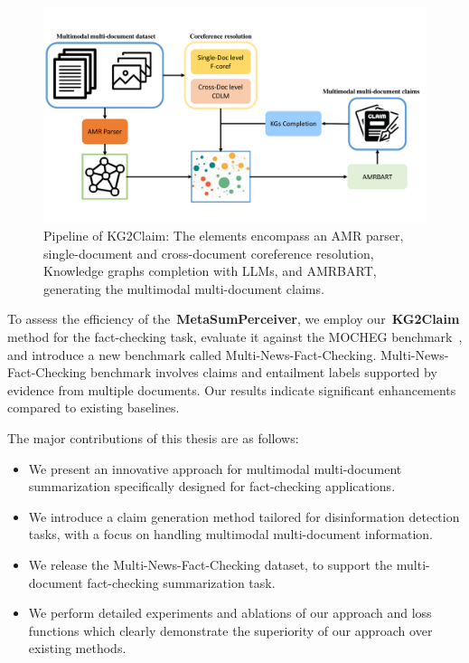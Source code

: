 \begin{figure}
\centering\includegraphics[width=\textwidth,height=0.5\textwidth,keepaspectratio]{images/amrkg2claim.pdf}
  \caption{Pipeline of KG2Claim: The elements encompass an AMR parser, single-document and cross-document coreference resolution, Knowledge graphs completion with LLMs, and AMRBART, generating the multimodal multi-document claims.}
  \label{fig:amrkg2claim}
\end{figure}

To assess the efficiency of the~\textbf{MetaSumPerceiver}, we employ our~\textbf{KG2Claim} method for the fact-checking task, evaluate it against the MOCHEG benchmark~\cite{Yao_2023}, and introduce a new benchmark called Multi-News-Fact-Checking. Multi-News-Fact-Checking benchmark involves claims and entailment labels supported by evidence from multiple documents. Our results indicate significant enhancements compared to existing baselines.

The major contributions of this thesis are as follows:
\begin{itemize}
  
    \item We present an innovative approach for multimodal multi-document summarization specifically designed for fact-checking applications.

    \item We introduce a claim generation method tailored for disinformation detection tasks, with a focus on handling multimodal multi-document information.

    \item We release the Multi-News-Fact-Checking dataset, to support the multi-document fact-checking summarization task.
  
    \item We perform detailed experiments and ablations of our approach and loss functions which clearly demonstrate the superiority of our approach over existing methods.
  
\end{itemize}